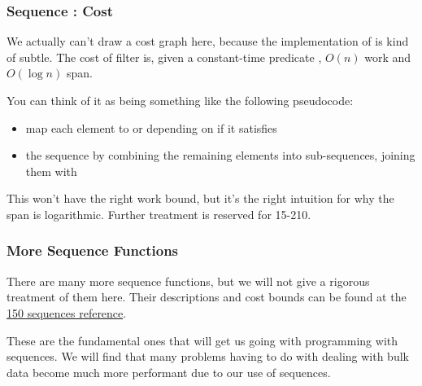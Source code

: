 \documentclass[aspectratio=169, handout]{beamer}
\newcommand{\fhex}[3][]{\node[hex, #1, fill=hexcolor, minimum width=0.4in] (#2) {#3}}
\begin{document}
\begin{frame}[fragile]
  \frametitle{Sequence : Cost}

  We actually can't draw a cost graph here, because the implementation of
   is kind of subtle. The cost of filter is, given a constant-time
  predicate , $O(n)$ work and $O(\log n)$ span.

  \pause
  \vspace{\fill}

  You can think of it as being something like the following pseudocode:

  \pause
  \begin{itemize}
    \item map each element to  or  depending on if it
    satisfies 
    \item {} the sequence by combining the remaining elements into
    sub-sequences, joining them with 
  \end{itemize}

  \pause
  \vspace{\fill}

  This won't have the right work bound, but it's the right intuition for
  why the span is logarithmic. Further treatment is reserved for 15-210.




\end{frame}

\begin{frame}[fragile]
  \frametitle{More Sequence Functions}

  There are many more sequence functions, but we will not give a rigorous
  treatment of them here. Their descriptions and cost bounds can be found
  at the
  {\color{blue}\href{http://www.cs.cmu.edu/~15150/resources/libraries/sequence.pdf}{150 sequences reference}}.

  \pause
  \vspace{\fill}

  These are the fundamental ones that will get us going with programming with
  sequences. We will find that many problems having to do with dealing with
  bulk data become much more performant due to our use of sequences.
\end{frame}
\end{document}
